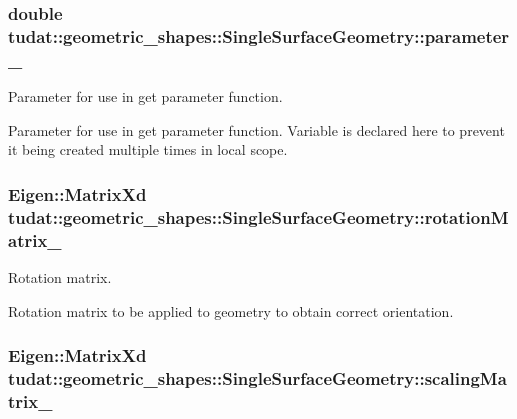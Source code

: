 \subsubsection[{\texorpdfstring{parameter\+\_\+}{parameter_}}]{\setlength{\rightskip}{0pt plus 5cm}double tudat\+::geometric\+\_\+shapes\+::\+Single\+Surface\+Geometry\+::parameter\+\_\+\hspace{0.3cm}{\ttfamily [protected]}}\hypertarget{classtudat_1_1geometric__shapes_1_1SingleSurfaceGeometry_a801c01c437b48a0066cda10f5f2fc896}{}\label{classtudat_1_1geometric__shapes_1_1SingleSurfaceGeometry_a801c01c437b48a0066cda10f5f2fc896}


Parameter for use in get parameter function. 

Parameter for use in get parameter function. Variable is declared here to prevent it being created multiple times in local scope. 
\subsubsection[{\texorpdfstring{rotation\+Matrix\+\_\+}{rotationMatrix_}}]{\setlength{\rightskip}{0pt plus 5cm}Eigen\+::\+Matrix\+Xd tudat\+::geometric\+\_\+shapes\+::\+Single\+Surface\+Geometry\+::rotation\+Matrix\+\_\+\hspace{0.3cm}{\ttfamily [protected]}}\hypertarget{classtudat_1_1geometric__shapes_1_1SingleSurfaceGeometry_a61a1d7b8952fb3d283ad409a2a5c4bd1}{}\label{classtudat_1_1geometric__shapes_1_1SingleSurfaceGeometry_a61a1d7b8952fb3d283ad409a2a5c4bd1}


Rotation matrix. 

Rotation matrix to be applied to geometry to obtain correct orientation. 
\subsubsection[{\texorpdfstring{scaling\+Matrix\+\_\+}{scalingMatrix_}}]{\setlength{\rightskip}{0pt plus 5cm}Eigen\+::\+Matrix\+Xd tudat\+::geometric\+\_\+shapes\+::\+Single\+Surface\+Geometry\+::scaling\+Matrix\+\_\+\hspace{0.3cm}{\ttfamily [protected]}}\hypertarget{classtudat_1_1geometric__shapes_1_1SingleSurfaceGeometry_ade223ab8cae98c7c90ad339e47e2fae8}{}\label{classtudat_1_1geometric__shapes_1_1SingleSurfaceGeometry_ade223ab8cae98c7c90ad339e47e2fae8}


